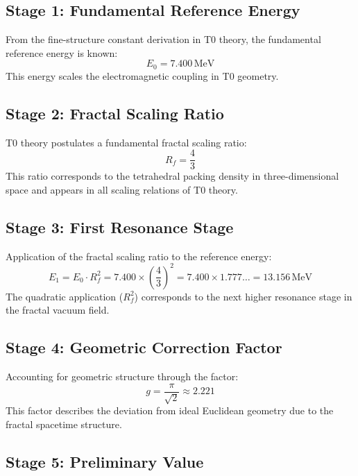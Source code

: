 \documentclass[12pt,a4paper]{article}
\begin{document}
	\subsection{Stage 1: Fundamental Reference Energy}
	
	From the fine-structure constant derivation in T0 theory, the fundamental reference energy is known:
	\begin{equation}
		E_0 = 7.400\,\text{MeV}
	\end{equation}
	This energy scales the electromagnetic coupling in T0 geometry.
	
	\subsection{Stage 2: Fractal Scaling Ratio}
	
	T0 theory postulates a fundamental fractal scaling ratio:
	\begin{equation}
		R_f = \frac{4}{3}
	\end{equation}
	This ratio corresponds to the tetrahedral packing density in three-dimensional space and appears in all scaling relations of T0 theory.
	
	\subsection{Stage 3: First Resonance Stage}
	
	Application of the fractal scaling ratio to the reference energy:
	\begin{equation}
		E_1 = E_0 \cdot R_f^2 = 7.400 \times \left(\frac{4}{3}\right)^2 = 7.400 \times 1.777\ldots = 13.156\,\text{MeV}
	\end{equation}
	The quadratic application ($R_f^2$) corresponds to the next higher resonance stage in the fractal vacuum field.
	
	\subsection{Stage 4: Geometric Correction Factor}
	
	Accounting for geometric structure through the factor:
	\begin{equation}
		g = \frac{\pi}{\sqrt{2}} \approx 2.221
	\end{equation}
	This factor describes the deviation from ideal Euclidean geometry due to the fractal spacetime structure.
	
	\subsection{Stage 5: Preliminary Value}
	
\end{document}
